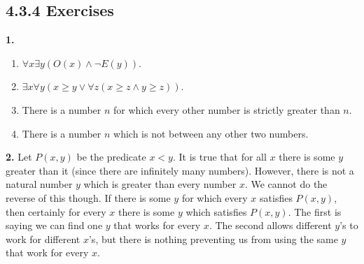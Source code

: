 \documentclass[10pt,]{book}
\theoremstyle{plain}
\theoremstyle{definition}
\theoremstyle{definition}
\theoremstyle{definition}
\numberwithin{equation}{chapter}
\newcommand{\lt}{ < }
\begin{document}
\subsection*{4.3.4 Exercises}
\noindent\textbf{1.}\quad{}\leavevmode%
\begin{enumerate}[label=(\alph*)]
\item\hypertarget{li-1075}{}\(\forall x \exists y (O(x) \wedge \neg E(y))\).%
\item\hypertarget{li-1076}{}\(\exists x \forall y (x \ge y \vee \forall z (x \ge z \wedge y \ge z))\).%
\item\hypertarget{li-1077}{}
                There is a number \(n\) for which every other number is strictly greater than \(n\).
\item\hypertarget{li-1078}{}
                There is a number \(n\) which is not between any other two numbers.
\end{enumerate}
\par\smallskip
\noindent\textbf{2.}\quad{}
            Let \(P(x,y)\) be the predicate \(x \lt  y\). It is true that for all \(x\) there is some \(y\) greater than it (since there are infinitely many numbers). However, there is not a natural number \(y\) which is greater than every number \(x\). We cannot do the reverse of this though. If there is some \(y\) for which every \(x\) satisfies \(P(x,y)\), then certainly for every \(x\) there is some \(y\) which satisfies \(P(x,y)\). The first is saying we can find one \(y\) that works for every \(x\). The second allows different \(y\)'s to work for different \(x\)'s, but there is nothing preventing us from using the same \(y\) that work for every \(x\).
\par\smallskip
\end{document}
